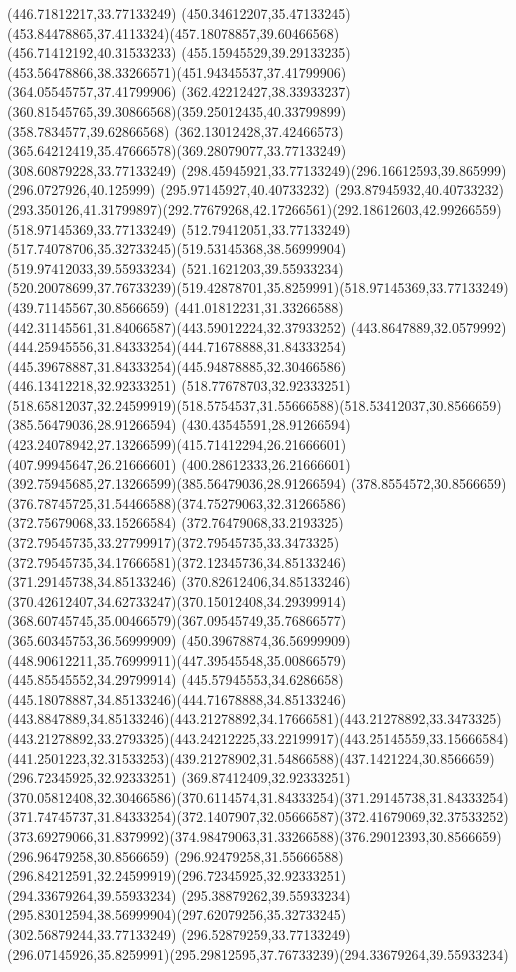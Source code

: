 {{\lineto(446.71812217,33.77133249)
\curveto(450.34612207,35.47133245)(453.84478865,37.4113324)(457.18078857,39.60466568)
\lineto(456.71412192,40.31533233)
\curveto(455.15945529,39.29133235)(453.56478866,38.33266571)(451.94345537,37.41799906)
\lineto(364.05545757,37.41799906)
\curveto(362.42212427,38.33933237)(360.81545765,39.30866568)(359.25012435,40.33799899)
\lineto(358.7834577,39.62866568)
\curveto(362.13012428,37.42466573)(365.64212419,35.47666578)(369.28079077,33.77133249)
\lineto(308.60879228,33.77133249)
\curveto(298.45945921,33.77133249)(296.16612593,39.865999)(296.0727926,40.125999)
\lineto(295.97145927,40.40733232)
\lineto(293.87945932,40.40733232)
\curveto(293.350126,41.31799897)(292.77679268,42.17266561)(292.18612603,42.99266559)
\closepath
\moveto(518.97145369,33.77133249)
\lineto(512.79412051,33.77133249)
\curveto(517.74078706,35.32733245)(519.53145368,38.56999904)(519.97412033,39.55933234)
\lineto(521.1621203,39.55933234)
\curveto(520.20078699,37.76733239)(519.42878701,35.8259991)(518.97145369,33.77133249)
\moveto(439.71145567,30.8566659)
\curveto(441.01812231,31.33266588)(442.31145561,31.84066587)(443.59012224,32.37933252)
\curveto(443.8647889,32.0579992)(444.25945556,31.84333254)(444.71678888,31.84333254)
\curveto(445.39678887,31.84333254)(445.94878885,32.30466586)(446.13412218,32.92333251)
\lineto(518.77678703,32.92333251)
\curveto(518.65812037,32.24599919)(518.5754537,31.55666588)(518.53412037,30.8566659)
\closepath
\moveto(385.56479036,28.91266594)
\lineto(430.43545591,28.91266594)
\curveto(423.24078942,27.13266599)(415.71412294,26.21666601)(407.99945647,26.21666601)
\curveto(400.28612333,26.21666601)(392.75945685,27.13266599)(385.56479036,28.91266594)
\moveto(378.8554572,30.8566659)
\curveto(376.78745725,31.54466588)(374.75279063,32.31266586)(372.75679068,33.15266584)
\curveto(372.76479068,33.2193325)(372.79545735,33.27799917)(372.79545735,33.3473325)
\curveto(372.79545735,34.17666581)(372.12345736,34.85133246)(371.29145738,34.85133246)
\curveto(370.82612406,34.85133246)(370.42612407,34.62733247)(370.15012408,34.29399914)
\curveto(368.60745745,35.00466579)(367.09545749,35.76866577)(365.60345753,36.56999909)
\lineto(450.39678874,36.56999909)
\curveto(448.90612211,35.76999911)(447.39545548,35.00866579)(445.85545552,34.29799914)
\curveto(445.57945553,34.6286658)(445.18078887,34.85133246)(444.71678888,34.85133246)
\curveto(443.8847889,34.85133246)(443.21278892,34.17666581)(443.21278892,33.3473325)
\curveto(443.21278892,33.2793325)(443.24212225,33.22199917)(443.25145559,33.15666584)
\curveto(441.2501223,32.31533253)(439.21278902,31.54866588)(437.1421224,30.8566659)
\closepath
\moveto(296.72345925,32.92333251)
\lineto(369.87412409,32.92333251)
\curveto(370.05812408,32.30466586)(370.6114574,31.84333254)(371.29145738,31.84333254)
\curveto(371.74745737,31.84333254)(372.1407907,32.05666587)(372.41679069,32.37533252)
\curveto(373.69279066,31.8379992)(374.98479063,31.33266588)(376.29012393,30.8566659)
\lineto(296.96479258,30.8566659)
\curveto(296.92479258,31.55666588)(296.84212591,32.24599919)(296.72345925,32.92333251)
\moveto(294.33679264,39.55933234)
\lineto(295.38879262,39.55933234)
\curveto(295.83012594,38.56999904)(297.62079256,35.32733245)(302.56879244,33.77133249)
\lineto(296.52879259,33.77133249)
\curveto(296.07145926,35.8259991)(295.29812595,37.76733239)(294.33679264,39.55933234)
}
}
